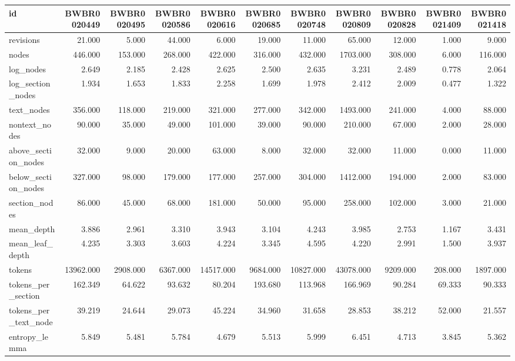 \begin{tabular}{lrrrrrrrrrr}
\toprule
id & BWBR0020449 & BWBR0020495 & BWBR0020586 & BWBR0020616 & BWBR0020685 & BWBR0020748 & BWBR0020809 & BWBR0020828 & BWBR0021409 & BWBR0021418 \\
\midrule
revisions & 21.000 & 5.000 & 44.000 & 6.000 & 19.000 & 11.000 & 65.000 & 12.000 & 1.000 & 9.000 \\
\cline{1-11}
nodes & 446.000 & 153.000 & 268.000 & 422.000 & 316.000 & 432.000 & 1703.000 & 308.000 & 6.000 & 116.000 \\
\cline{1-11}
log\_nodes & 2.649 & 2.185 & 2.428 & 2.625 & 2.500 & 2.635 & 3.231 & 2.489 & 0.778 & 2.064 \\
\cline{1-11}
log\_section\_nodes & 1.934 & 1.653 & 1.833 & 2.258 & 1.699 & 1.978 & 2.412 & 2.009 & 0.477 & 1.322 \\
\cline{1-11}
text\_nodes & 356.000 & 118.000 & 219.000 & 321.000 & 277.000 & 342.000 & 1493.000 & 241.000 & 4.000 & 88.000 \\
\cline{1-11}
nontext\_nodes & 90.000 & 35.000 & 49.000 & 101.000 & 39.000 & 90.000 & 210.000 & 67.000 & 2.000 & 28.000 \\
\cline{1-11}
above\_section\_nodes & 32.000 & 9.000 & 20.000 & 63.000 & 8.000 & 32.000 & 32.000 & 11.000 & 0.000 & 11.000 \\
\cline{1-11}
below\_section\_nodes & 327.000 & 98.000 & 179.000 & 177.000 & 257.000 & 304.000 & 1412.000 & 194.000 & 2.000 & 83.000 \\
\cline{1-11}
section\_nodes & 86.000 & 45.000 & 68.000 & 181.000 & 50.000 & 95.000 & 258.000 & 102.000 & 3.000 & 21.000 \\
\cline{1-11}
mean\_depth & 3.886 & 2.961 & 3.310 & 3.943 & 3.104 & 4.243 & 3.985 & 2.753 & 1.167 & 3.431 \\
\cline{1-11}
mean\_leaf\_depth & 4.235 & 3.303 & 3.603 & 4.224 & 3.345 & 4.595 & 4.220 & 2.991 & 1.500 & 3.937 \\
\cline{1-11}
tokens & 13962.000 & 2908.000 & 6367.000 & 14517.000 & 9684.000 & 10827.000 & 43078.000 & 9209.000 & 208.000 & 1897.000 \\
\cline{1-11}
tokens\_per\_section & 162.349 & 64.622 & 93.632 & 80.204 & 193.680 & 113.968 & 166.969 & 90.284 & 69.333 & 90.333 \\
\cline{1-11}
tokens\_per\_text\_node & 39.219 & 24.644 & 29.073 & 45.224 & 34.960 & 31.658 & 28.853 & 38.212 & 52.000 & 21.557 \\
\cline{1-11}
entropy\_lemma & 5.849 & 5.481 & 5.784 & 4.679 & 5.513 & 5.999 & 6.451 & 4.713 & 3.845 & 5.362 \\

\end{tabular}
